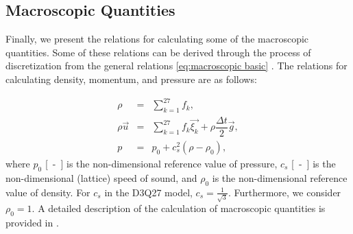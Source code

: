 \subsection{Macroscopic Quantities}\label{macro}
Finally, we present the relations for calculating some of the macroscopic quantities. Some of these relations can be derived through the process of discretization from the general relations \eqref{eq:macroscopic basic} \cite{Kruger}. The relations for calculating density, momentum, and pressure are as follows:

\begin{subequations}\label{macroeq}
	\begin{eqnarray}
		\label{rho}
		\rho &=& \sum_{k=1}^{27} f_{k},\\[3pt]
		\rho \vec{u} &=& \sum_{k=1}^{27} f_{k} \vec{\xi_{k}} + \rho \dfrac{\Delta t}{2} \vec{g},\\[3pt]
		p &=& p_0 + c_{s}^{2} (\rho - \rho_0),
	\end{eqnarray}
\end{subequations}
where $ p_0 $ \si{[-]} is the non-dimensional reference value of pressure, $ c_s $ \si{[-]} is the non-dimensional (lattice) speed of sound, and $ \rho_0 $ is the non-dimensional reference value of density. For $ c_s $ in the D3Q27 model, $ c_s = \frac{1}{\sqrt{3}} $. Furthermore, we consider $ \rho_0 = 1 $. A detailed description of the calculation of macroscopic quantities is provided in \cite{Kruger}.